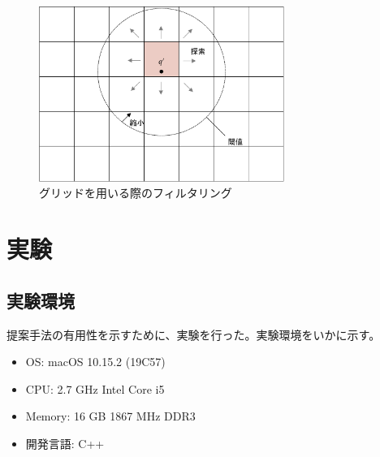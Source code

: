 \documentclass{deimj}
\begin{document}
\begin{figure}[H]
	\centering
    \includegraphics[width=8cm]{images/sol-grid-filter.pdf}
    \caption{グリッドを用いる際のフィルタリング}
    \label{fig:sol-grid-filter}
\end{figure}



\section{実験}
\subsection{実験環境}
提案手法の有用性を示すために、実験を行った。実験環境をいかに示す。
\begin{itemize}
  \item OS: macOS 10.15.2 (19C57)
  \item CPU: 2.7 GHz Intel Core i5
  \item Memory: 16 GB 1867 MHz DDR3
  \item 開発言語: C++
\end{itemize}
\end{document}
